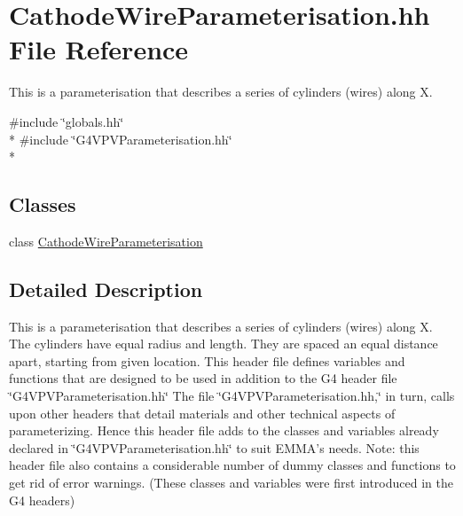 \hypertarget{CathodeWireParameterisation_8hh}{\section{Cathode\-Wire\-Parameterisation.\-hh File Reference}
\label{CathodeWireParameterisation_8hh}
}


This is a parameterisation that describes a series of cylinders (wires) along X.  


{\ttfamily \#include \char`\"{}globals.\-hh\char`\"{}}\\*
{\ttfamily \#include \char`\"{}G4\-V\-P\-V\-Parameterisation.\-hh\char`\"{}}\\*
\subsection*{Classes}
\begin{DoxyCompactItemize}
\item 
class \hyperlink{classCathodeWireParameterisation}{Cathode\-Wire\-Parameterisation}
\end{DoxyCompactItemize}


\subsection{Detailed Description}
This is a parameterisation that describes a series of cylinders (wires) along X. The cylinders have equal radius and length. They are spaced an equal distance apart, starting from given location. This header file defines variables and functions that are designed to be used in addition to the G4 header file \char`\"{}\-G4\-V\-P\-V\-Parameterisation.\-hh\char`\"{} The file \char`\"{}\-G4\-V\-P\-V\-Parameterisation.\-hh,\char`\"{} in turn, calls upon other headers that detail materials and other technical aspects of parameterizing. Hence this header file adds to the classes and variables already declared in \char`\"{}\-G4\-V\-P\-V\-Parameterisation.\-hh\char`\"{} to suit E\-M\-M\-A's needs. Note\-: this header file also contains a considerable number of dummy classes and functions to get rid of error warnings. (These classes and variables were first introduced in the G4 headers) 
